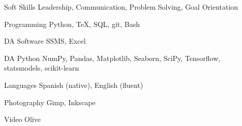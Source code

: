 
\begin{cvskills}

        \cvskill
        {Soft Skills}
    {Leadership, Communication, Problem Solving, Goal Orientation}

	\cvskill
	{Programming}
    {Python, \TeX, SQL, git, Bash}

        \cvskill
        {DA Software}
    {SSMS, Excel}

	\cvskill
	{DA Python}
    {NumPy, Pandas, Matplotlib, Seaborn, SciPy, Tensorflow, statsmodels, scikit-learn}

        \cvskill
        {Languages}
    {Spanish (native), English (fluent)}

	\cvskill
    {Photography}
    {Gimp, Inkscape}

    \cvskill
    {Video}
    {Olive}

\end{cvskills}
